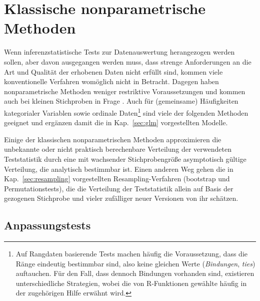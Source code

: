 \chapter{Klassische nonparametrische Methoden}
\label{sec:bioStat}

Wenn inferenzstatistische Tests zur Datenauswertung herangezogen werden sollen, aber davon ausgegangen werden muss, dass strenge Anforderungen an die Art und Qualität der erhobenen Daten nicht erfüllt sind, kommen viele konventionelle Verfahren womöglich nicht in Betracht. 
Dagegen haben nonparametrische Methoden weniger restriktive Voraussetzungen und kommen auch bei kleinen Stichproben in Frage \cite{Bortz2008a, Buning1994}. Auch für (gemeinsame) Häufigkeiten kategorialer Variablen sowie ordinale Daten\footnote{Auf Rangdaten basierende Tests machen häufig die Voraussetzung, dass die Ränge eindeutig bestimmbar sind, also keine gleichen Werte (\emph{Bindungen}, \emph{ties}) auftauchen. Für den Fall, dass dennoch Bindungen vorhanden sind, existieren unterschiedliche Strategien, wobei die von R-Funktionen gewählte häufig in der zugehörigen Hilfe erwähnt wird.} sind viele der folgenden Methoden geeignet und ergänzen damit die in Kap.\ \ref{sec:glm} vorgestellten Modelle.

Einige der klassischen nonparametrischen Methoden approximieren die unbekannte oder nicht praktisch berechenbare Verteilung der verwendeten Teststatistik durch eine mit wachsender Stichprobengröße asymptotisch gültige Verteilung, die analytisch bestimmbar ist. Einen anderen Weg gehen die in Kap.\ \ref{sec:resampling} vorgestellten Resampling-Verfahren (bootstrap und Permutationstests), die die Verteilung der Teststatistik allein auf Basis der gezogenen Stichprobe und vieler zufälliger neuer Versionen von ihr schätzen.

\section{Anpassungstests}
\label{sec:modelTests}

